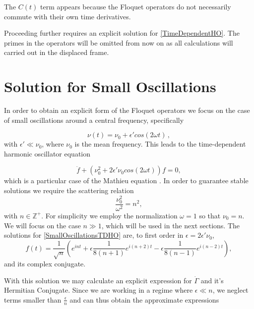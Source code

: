 \documentclass[reprint, amsmath,amssymb, aps,pra]{revtex4-1}
\begin{document}
The $C(t)$ term appears because the Floquet operators do not necessarily commute with
their own time derivatives.

Proceeding further requires an explicit solution for
\eqref{TimeDependentHO}. The primes in the operators will be omitted
from now on as all calculations will carried out in the displaced frame.


\section{Solution for Small Oscillations}\label{SolSmallOsc}
 
In order to obtain an explicit form of the Floquet operators we focus
on the case of small oscillations around a central frequency,
specifically

\begin{equation}
\nu(t) = \nu_0 + \epsilon' cos(2\omega t)\, ,
\end{equation}
with $\epsilon' \ll \nu_0$, where $\nu_0$ is the mean frequency. This
leads to the time-dependent harmonic oscillator equation

\begin{equation}\label{SmallOscillationsTDHO}
\ddot{f} + (\nu_0^2 + 2\epsilon' \nu_0 cos(2\omega t))f = 0,
\end{equation}
which is a particular case of the Mathieu equation \cite{PiatekME}.
In order to guarantee stable solutions we require the scattering
relation
\begin{equation}
\frac{\nu_0^2}{\omega^2} = n^2,\label{scattering}
\end{equation}
with $n \in \mathbb{Z}^+$\cite{WardFT}. For simplicity we employ the normalization $\omega=1$ so that $\nu_0=n$. We will focus on the case
$n\gg 1$, which will be used in the next sections. The solutions for
\eqref{SmallOscillationsTDHO} are, to first order in
$\epsilon= 2\epsilon' \nu_0$,
\begin{equation}\label{SmallOscillationsSolution}
f(t)=  \frac{1}{\sqrt{n}}(e^{int}  + \epsilon \frac{1}{8(n+1)} e^{i(n+2) t} - \epsilon \frac{1}{8(n-1)} e^{i(n-2)t}),
\end{equation} and its complex conjugate. 

With this solution we may calculate an explicit expression for $\dot{\Gamma}$ and it's Hermitian Conjugate. Since we are working in a regime where $\epsilon \ll n$, we neglect terms smaller than $\frac{\epsilon}{n}$ and can thus obtain the approximate expressions
\end{document}
